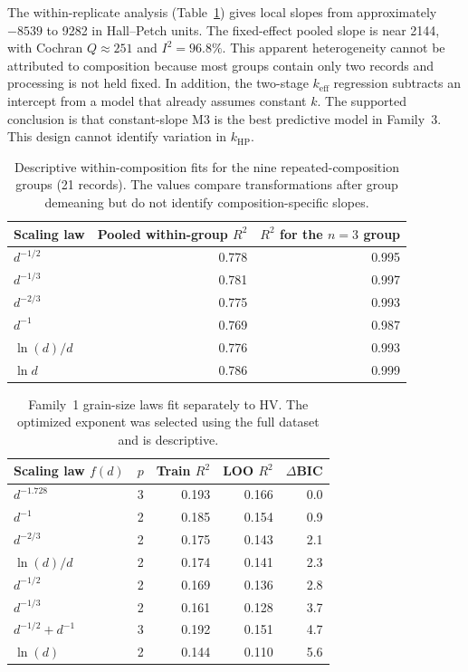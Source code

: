 \documentclass[a4paper,11pt]{article}
\begin{document}
The within-replicate analysis (Table~\ref{tab:withingroup}) gives local slopes from approximately $-8539$ to 9282 in Hall--Petch units. The fixed-effect pooled slope is near 2144, with Cochran $Q\approx251$ and $I^2=96.8\%$. This apparent heterogeneity cannot be attributed to composition because most groups contain only two records and processing is not held fixed. In addition, the two-stage $k_{\mathrm{eff}}$ regression subtracts an intercept from a model that already assumes constant $k$. The supported conclusion is that constant-slope M3 is the best predictive model in Family~3. This design cannot identify variation in $k_{\mathrm{HP}}$.

\begin{table}[H]
\centering
\caption{Descriptive within-composition fits for the nine repeated-composition groups (21 records). The values compare transformations after group demeaning but do not identify composition-specific slopes.}
\label{tab:withingroup}
\small
\begin{tabular}{lrr}
\toprule
Scaling law & Pooled within-group $R^2$ & $R^2$ for the $n=3$ group \\
\midrule
$d^{-1/2}$ & 0.778 & 0.995 \\
$d^{-1/3}$ & 0.781 & 0.997 \\
$d^{-2/3}$ & 0.775 & 0.993 \\
$d^{-1}$ & 0.769 & 0.987 \\
$\ln(d)/d$ & 0.776 & 0.993 \\
$\ln d$ & 0.786 & 0.999 \\
\bottomrule
\end{tabular}
\end{table}

\begin{table}[H]
\centering
\caption{Family~1 grain-size laws fit separately to HV. The optimized exponent was selected using the full dataset and is descriptive.}
\label{tab:hvscaling}
\small
\begin{tabular}{lrrrr}
\toprule
Scaling law $f(d)$ & $p$ & Train $R^2$ & LOO $R^2$ & $\Delta$BIC \\
\midrule
$d^{-1.728}$ & 3 & 0.193 & 0.166 & 0.0 \\
$d^{-1}$ & 2 & 0.185 & 0.154 & 0.9 \\
$d^{-2/3}$ & 2 & 0.175 & 0.143 & 2.1 \\
$\ln(d)/d$ & 2 & 0.174 & 0.141 & 2.3 \\
$d^{-1/2}$ & 2 & 0.169 & 0.136 & 2.8 \\
$d^{-1/3}$ & 2 & 0.161 & 0.128 & 3.7 \\
$d^{-1/2}+d^{-1}$ & 3 & 0.192 & 0.151 & 4.7 \\
$\ln(d)$ & 2 & 0.144 & 0.110 & 5.6 \\
\bottomrule
\end{tabular}
\end{table}
\end{document}
